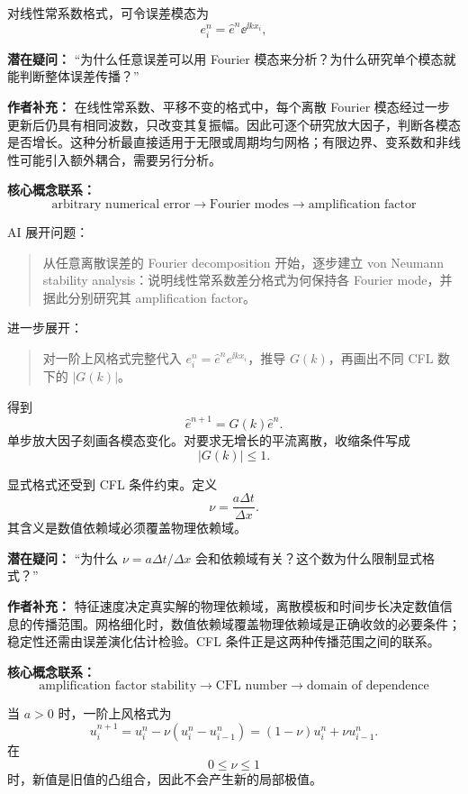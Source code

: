 对线性常系数格式，可令误差模态为
\[
e_i^n=\widehat e^n\ee^{\ii kx_i},
\]

\begin{authornote}
\textbf{潜在疑问：}
“为什么任意误差可以用 Fourier 模态来分析？为什么研究单个模态就能判断整体误差传播？”

\textbf{作者补充：}
在线性常系数、平移不变的格式中，每个离散 Fourier 模态经过一步更新后仍具有相同波数，只改变其复振幅。因此可逐个研究放大因子，判断各模态是否增长。这种分析最直接适用于无限或周期均匀网格；有限边界、变系数和非线性可能引入额外耦合，需要另行分析。

\textbf{核心概念联系：}
\[
\text{arbitrary numerical error}
\longrightarrow
\text{Fourier modes}
\longrightarrow
\text{amplification factor}
\]
\end{authornote}

\begin{askai}
AI 展开问题：
\begin{quote}
从任意离散误差的 Fourier decomposition 开始，逐步建立 von Neumann stability analysis：说明线性常系数差分格式为何保持各 Fourier mode，并据此分别研究其 amplification factor。
\end{quote}

进一步展开：
\begin{quote}
对一阶上风格式完整代入 \(e_i^n=\widehat e^n e^{\ii kx_i}\)，推导 \(G(k)\)，再画出不同 CFL 数下的 \(|G(k)|\)。
\end{quote}
\end{askai}

得到
\[
\widehat e^{n+1}=G(k)\widehat e^n.
\]
单步放大因子刻画各模态变化。对要求无增长的平流离散，收缩条件写成
\[
|G(k)|\le1.
\]

显式格式还受到 CFL 条件约束。定义
\[
\nu=\frac{a\Delta t}{\Delta x}.
\]
其含义是数值依赖域必须覆盖物理依赖域。

\begin{authornote}
\textbf{潜在疑问：}
“为什么 \(\nu=a\Delta t/\Delta x\) 会和依赖域有关？这个数为什么限制显式格式？”

\textbf{作者补充：}
特征速度决定真实解的物理依赖域，离散模板和时间步长决定数值信息的传播范围。网格细化时，数值依赖域覆盖物理依赖域是正确收敛的必要条件；稳定性还需由误差演化估计检验。CFL 条件正是这两种传播范围之间的联系。

\textbf{核心概念联系：}
\[
\text{amplification factor stability}
\longrightarrow
\text{CFL number}
\longrightarrow
\text{domain of dependence}
\]
\end{authornote}

当 \(a>0\) 时，一阶上风格式为
\[
u_i^{n+1}
=
u_i^n-\nu(u_i^n-u_{i-1}^n)
=
(1-\nu)u_i^n+\nu u_{i-1}^n.
\]
在
\[
0\le\nu\le1
\]
时，新值是旧值的凸组合，因此不会产生新的局部极值。

